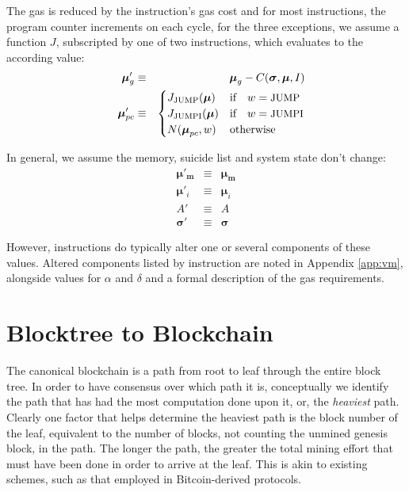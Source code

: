 \documentclass[9pt,oneside]{amsart}
\begin{document}
\begin{multicols}{2}
The gas is reduced by the instruction's gas cost and for most instructions, the program counter increments on each cycle, for the three exceptions, we assume a function $J$, subscripted by one of two instructions, which evaluates to the according value:
\begin{eqnarray}
\quad \boldsymbol{\mu}'_{g} & \equiv & \boldsymbol{\mu}_{g} - C(\boldsymbol{\sigma}, \boldsymbol{\mu}, I) \\
\quad \boldsymbol{\mu}'_{pc} & \equiv & \begin{cases}
J_{\text{JUMP}}(\boldsymbol{\mu}) & \text{if} \quad w = \text{\small JUMP} \\
J_{\text{JUMPI}}(\boldsymbol{\mu}) & \text{if} \quad w = \text{\small JUMPI} \\
N(\boldsymbol{\mu}_{pc}, w) & \text{otherwise}
\end{cases}
\end{eqnarray}

In general, we assume the memory, suicide list and system state don't change:
\begin{eqnarray}
\boldsymbol{\mu}'_\mathbf{m} & \equiv & \boldsymbol{\mu}_\mathbf{m} \\
\boldsymbol{\mu}'_i & \equiv & \boldsymbol{\mu}_i \\
A' & \equiv & A \\
\boldsymbol{\sigma}' & \equiv & \boldsymbol{\sigma}
\end{eqnarray}

However, instructions do typically alter one or several components of these values. Altered components listed by instruction are noted in Appendix \ref{app:vm}, alongside values for $\alpha$ and $\delta$ and a formal description of the gas requirements.

\section{Blocktree to Blockchain} \label{ch:ghost}

The canonical blockchain is a path from root to leaf through the entire block tree. In order to have consensus over which path it is, conceptually we identify the path that has had the most computation done upon it, or, the \textit{heaviest} path. Clearly one factor that helps determine the heaviest path is the block number of the leaf, equivalent to the number of blocks, not counting the unmined genesis block, in the path. The longer the path, the greater the total mining effort that must have been done in order to arrive at the leaf. This is akin to existing schemes, such as that employed in Bitcoin-derived protocols.


\end{multicols}
\end{document}
